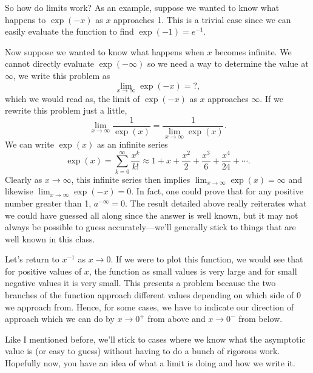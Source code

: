 \documentclass[final,a4paper,12pt]{article}
\theoremstyle{definition}
\begin{document}
So how do limits work?  As an example, suppose we wanted to know what
happens to $\exp(-x)$ as $x$ approaches 1.  This is a trivial case since we can
easily evaluate the function to find $\exp(-1) = e^{-1}$.

Now suppose we wanted to know what happens when $x$ becomes infinite.  We
cannot directly evaluate $\exp(-\infty)$ so we need a way to determine the value
at $\infty$, we write this problem as
\begin{equation}
    \lim_{x \to \infty} \exp(-x) = ? ,
\end{equation}
which we would read as, the limit of $\exp(-x)$ as $x$ approaches $\infty$.  If
we rewrite this problem just a little,
\begin{equation}
    \lim_{x \to \infty} \frac{1}{\exp(x)} = \frac{1}{\displaystyle \lim_{x \to \infty} \exp(x)} .
\end{equation}
We can write $\exp(x)$ as an infinite series
\begin{equation}
    \exp(x) = \sum_{k = 0}^\infty \frac{x^k}{k!} \approx 1 + x + \frac{x^2}{2} +
    \frac{x^3}{6} + \frac{x^4}{24} + \cdots .
\end{equation}
Clearly as $x \to \infty$, this infinite series then implies $\displaystyle \lim_{x \to \infty}
\exp(x) = \infty$ and likewise $\displaystyle \lim_{x \to \infty} \exp(-x) = 0$.  In
fact, one could prove that for any positive number greater than 1,
$a^{-\infty} = 0$.  The result detailed above really reiterates what we could have
guessed all along since the answer is well known, but it may not
always be possible to guess accurately---we'll generally stick to things that
are well known in this class.

Let's return to $x^{-1}$ as $x \to 0$.  If we were to plot this function, we
would see that for positive values of $x$, the function as small values is very
large and for small negative values it is very small.  This presents a problem
because the two branches of the function approach different values depending on
which side of 0 we approach from.  Hence, for some cases, we have to indicate
our direction of approach which we can do by $x \to 0^+$ from above and $x \to
0^-$ from below.

Like I mentioned before, we'll stick to cases where we know what the asymptotic
value is (or easy to guess) without having to do a bunch of rigorous work.
Hopefully now, you have an idea of what a limit is doing and how we write it.
\end{document}
